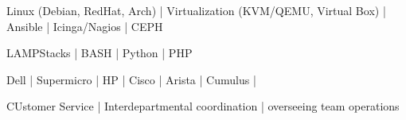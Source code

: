 
\begin{cvskills}

	\cvskill
	{}{Linux (Debian, RedHat, Arch) | Virtualization (KVM/QEMU, Virtual Box) | Ansible | Icinga/Nagios | CEPH}

	\cvskill
	{}{LAMP\LEMP Stacks | BASH | Python | PHP}

	\cvskill
	{}{Dell | Supermicro | HP | Cisco | Arista | Cumulus |}

	\cvskill
	{}{CUstomer Service | Interdepartmental coordination | overseeing team operations}

\end{cvskills}

